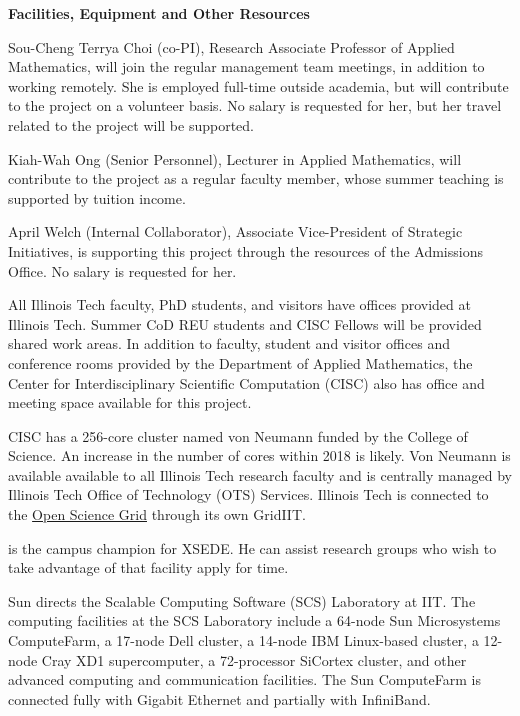 \documentclass[11pt]{NSFamsart}
\begin{document}
\newpage \setcounter{page}{1} %


\centerline{\textbf{\Large Facilities, Equipment and Other Resources}}
\hypertarget{Facilities}{}

\bigskip

Sou-Cheng Terrya Choi (co-PI), Research Associate Professor of Applied Mathematics, will join the regular management team meetings, in addition to working remotely.  She is employed full-time outside academia, but will contribute to the project on a volunteer 
basis.  No salary is requested for her, but her travel related to the project will be supported.

Kiah-Wah Ong (Senior Personnel), Lecturer in Applied Mathematics, will contribute to the project as a regular faculty member, whose summer teaching is supported by tuition income.

April Welch (Internal Collaborator), Associate Vice-President of Strategic Initiatives, is supporting this project through the resources of the Admissions Office.  No salary is requested for her.

All Illinois Tech faculty, PhD students, and visitors have offices provided at Illinois Tech.  Summer CoD REU students and CISC Fellows will be provided shared work areas.  In addition to faculty, student and visitor 
offices and conference rooms provided by the Department of Applied Mathematics, the Center for Interdisciplinary Scientific Computation (CISC) also has office and meeting space available for this project.

CISC has a 256-core cluster named von Neumann funded by the 
College of Science.  An increase in the number of cores within 2018 is likely. Von Neumann is available available to all Illinois Tech research faculty and is
centrally managed by Illinois Tech Office of Technology (OTS) Services.  Illinois Tech is connected to the \href{https://www.opensciencegrid.org}{Open Science Grid} through its own GridIIT.  

\JW is the campus champion for XSEDE.  He can assist research groups who wish to take advantage of that facility apply for time.

Sun directs the Scalable Computing Software (SCS) Laboratory at IIT. The computing facilities at the SCS Laboratory include a 64-node Sun Microsystems ComputeFarm, a 17-node Dell cluster, a 14-node IBM Linux-based cluster, a 12-node Cray XD1 supercomputer, a 72-processor SiCortex cluster, and other advanced computing and communication facilities. The Sun ComputeFarm is connected fully with Gigabit Ethernet and partially with InfiniBand.
\end{document}

